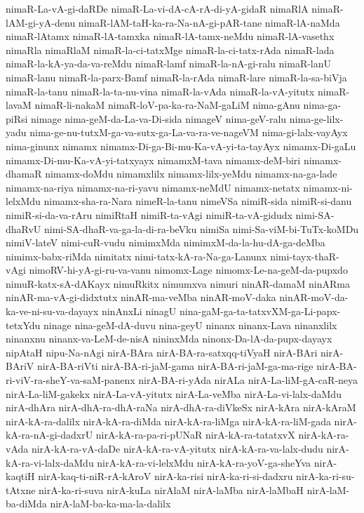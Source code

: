 {nimaR-La-vA-gi-daRDe
nimaR-La-vi-dA-cA-rA-di-yA-gidaR
nimaRlA
nimaR-lAM-gi-yA-denu
nimaR-lAM-taH-ka-ra-Na-nA-gi-pAR-tane
nimaR-lA-naMda
nimaR-lAtamx
nimaR-lA-tamxka
nimaR-lA-tamx-neMdu
nimaR-lA-vasethx
nimaRla
nimaRlaM
nimaR-la-ci-tatxMge
nimaR-la-ci-tatx-rAda
nimaR-lada
nimaR-la-kA-ya-da-va-reMdu
nimaR-lamf
nimaR-la-nA-gi-ralu
nimaR-lanU
nimaR-lanu
nimaR-la-parx-Bamf
nimaR-la-rAda
nimaR-lare
nimaR-la-sa-biVja
nimaR-la-tanu
nimaR-la-ta-nu-vina
nimaR-la-vAda
nimaR-la-vA-yitutx
nimaR-lavaM
nimaR-li-nakaM
nimaR-loV-pa-ka-ra-NaM-gaLiM
nima-gAnu
nima-ga-piRsi
nimage
nima-geM-da-La-va-Di-sida
nimageV
nima-geV-ralu
nima-ge-lilx-yadu
nima-ge-nu-tutxM-ga-va-sutx-ga-La-va-ra-ve-nageVM
nima-gi-lalx-vayAyx
nima-ginunx
nimamx
nimamx-Di-ga-Bi-mu-Ka-vA-yi-ta-tayAyx
nimamx-Di-gaLu
nimamx-Di-mu-Ka-vA-yi-tatxyayx
nimamxM-tava
nimamx-deM-biri
nimamx-dhamaR
nimamx-doMdu
nimamxlilx
nimamx-lilx-yeMdu
nimamx-na-ga-lade
nimamx-na-riya
nimamx-na-ri-yavu
nimamx-neMdU
nimamx-netatx
nimamx-ni-lelxMdu
nimamx-sha-ra-Nara
nimeR-la-tanu
nimeVSa
nimiR-sida
nimiR-si-danu
nimiR-si-da-va-rAru
nimiRtaH
nimiR-ta-vAgi
nimiR-ta-vA-gidudx
nimi-SA-dhaRvU
nimi-SA-dhaR-va-ga-la-di-ra-beVku
nimiSa
nimi-Sa-viM-bi-TuTx-koMDu
nimiV-lateV
nimi-cuR-vudu
nimimxMda
nimimxM-da-la-hu-dA-ga-deMba
nimimx-babx-riMda
nimitatx
nimi-tatx-kA-ra-Na-ga-Lanunx
nimi-tayx-thaR-vAgi
nimoRV-hi-yA-gi-ru-va-vanu
nimomx-Lage
nimomx-Le-na-geM-da-pupxdo
nimuR-katx-sA-dAKayx
nimuRkitx
nimumxva
nimuri
ninAR-damaM
ninARma
ninAR-ma-vA-gi-didxtutx
ninAR-ma-veMba
ninAR-moV-daka
ninAR-moV-da-ka-ve-ni-su-va-dayayx
ninAnxLi
ninagU
nina-gaM-ga-ta-tatxvXM-ga-Li-papx-tetxYdu
ninage
nina-geM-dA-duvu
nina-geyU
ninanx
ninanx-Lava
ninanxlilx
ninanxnu
ninanx-va-LeM-de-nisA
nininxMda
ninonx-Da-lA-da-pupx-dayayx
nipAtaH
nipu-Na-nAgi
nirA-BAra
nirA-BA-ra-satxqq-tiVyaH
nirA-BAri
nirA-BAriV
nirA-BA-riVti
nirA-BA-ri-jaM-gama
nirA-BA-ri-jaM-ga-ma-rige
nirA-BA-ri-viV-ra-sheY-va-saM-panenx
nirA-BA-ri-yAda
nirALa
nirA-La-liM-gA-caR-neya
nirA-La-liM-gakekx
nirA-La-vA-yitutx
nirA-La-veMba
nirA-La-vi-lalx-daMdu
nirA-dhAra
nirA-dhA-ra-dhA-raNa
nirA-dhA-ra-diVkeSx
nirA-kAra
nirA-kAraM
nirA-kA-ra-dalilx
nirA-kA-ra-diMda
nirA-kA-ra-liMga
nirA-kA-ra-liM-gada
nirA-kA-ra-nA-gi-dadxrU
nirA-kA-ra-pa-ri-pUNaR
nirA-kA-ra-tatatxvX
nirA-kA-ra-vAda
nirA-kA-ra-vA-daDe
nirA-kA-ra-vA-yitutx
nirA-kA-ra-va-lalx-dudu
nirA-kA-ra-vi-lalx-daMdu
nirA-kA-ra-vi-lelxMdu
nirA-kA-ra-yoV-ga-sheYva
nirA-kaqtiH
nirA-kaq-ti-niR-rA-kAroV
nirA-ka-risi
nirA-ka-ri-si-dadxru
nirA-ka-ri-su-tAtxne
nirA-ka-ri-suva
nirA-kuLa
nirAlaM
nirA-laMba
nirA-laMbaH
nirA-laM-ba-diMda
nirA-laM-ba-ka-ma-la-dalilx
}
